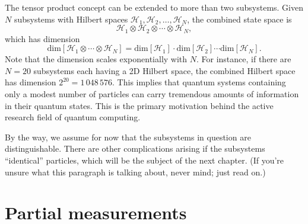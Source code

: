 \documentclass[prx,12pt]{revtex4-2}
\begin{document}
The tensor product concept can be extended to more than two
subsystems.  Given $N$ subsystems with Hilbert spaces $\mathscr{H}_1,
\mathscr{H}_2, \dots, \mathscr{H}_N$, the combined state space is
\begin{equation}
  \mathscr{H}_1 \otimes \mathscr{H}_2 \otimes \cdots \otimes
  \mathscr{H}_N,
\end{equation}
which has dimension
\begin{equation}
  \mathrm{dim}\left[\mathscr{H}_1 \otimes \cdots \otimes \mathscr{H}_N\right]
  = \mathrm{dim}\left[\mathscr{H}_1\right] \cdot
  \mathrm{dim}\left[\mathscr{H}_2\right] \cdots
  \mathrm{dim}\left[\mathscr{H}_N\right].
\end{equation}
Note that the dimension scales exponentially with $N$.  For instance,
if there are $N = 20$ subsystems each having a 2D Hilbert space, the
combined Hilbert space has dimension $2^{20} =1\,048\,576$.  This
implies that quantum systems containing only a modest number of
particles can carry tremendous amounts of information in their quantum
states.  This is the primary motivation behind the active research
field of quantum computing.


By the way, we assume for now that the subsystems in question are
distinguishable.  There are other complications arising if the
subsystems ``identical'' particles, which will be the subject of the
next chapter.  (If you're unsure what this paragraph is talking about,
never mind; just read on.)

\section{Partial measurements}
\label{sec:partialmeasurements}
\end{document}

